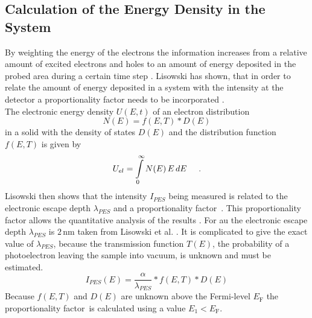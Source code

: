 \documentclass[a4paper,12pt,twoside]{article}
\begin{document}
    \subsection{Calculation of the Energy Density in the System}
        \label{chapED}
By weighting the energy of the electrons the information increases from a relative amount of excited electrons and holes to an amount of energy deposited in the probed area during a certain time step \cite{Lisowski2004}. Lisowski has shown, that in order to relate the amount of energy deposited in a system with the intensity at the detector a proportionality factor needs to be incorporated \cite{Lisowski}.
\\
The electronic energy density $U(E,t)$ of an electron distribution
   \begin{equation}
        \label{eldistribution}
        N(E) = f(E,T) * D(E)
    \end{equation}
in a solid with the density of states $D(E)$ and the distribution function $f(E,T)$ is given by
    \begin{equation}
        \label{energydensitystart}
        U_{el} = \int\limits_{ 0}^{ \infty }{ N(E)\, E \,dE} \hspace{5mm}.
    \end{equation}
Lisowski then shows that the intensity $I_{PES}$ being measured is related to the electronic escape depth $\lambda_{PES}$ and a proportionality factor \textalpha\,. This proportionality factor allows the quantitative analysis of the results \cite{Lisowski}. For \gls{au} the electronic escape depth $\lambda_{PES}$ is $2\,\mathrm{nm}$ taken from Lisowski et al. \cite{Lisowski2004}. It is complicated to give the exact value of $\lambda_{PES}$, because the transmission function $T(E)$, the probability of a photoelectron leaving the sample into vacuum, is unknown and must be estimated.
\begin{equation}
    \label{alpha}
I_{PES} (E) = \frac{ \alpha }{ \lambda_{PES} } * f(E,T) * D(E)
\end{equation}
Because $f(E,T)$ and $D(E)$ are unknown above the Fermi-level $E_{\mathrm{F}}$ the proportionality factor \textalpha\,is calculated using a value $E_{\mathrm{1}} < E_{\mathrm{F}}$.
\end{document}
